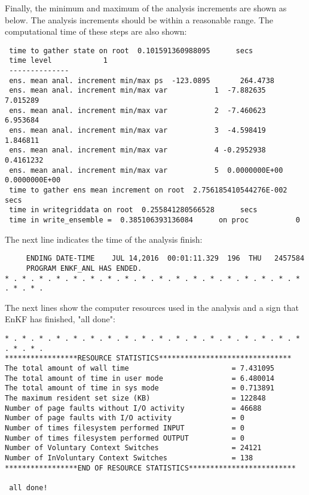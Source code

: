Finally, the minimum and maximum of the analysis increments are shown as below. The analysis increments should be within a reasonable range. The computational time of these steps are also shown:
\begin{scriptsize}
\begin{verbatim}
 time to gather state on root  0.101591360988095      secs
 time level            1
 --------------
 ens. mean anal. increment min/max ps  -123.0895       264.4738
 ens. mean anal. increment min/max var           1  -7.882635       7.015289
 ens. mean anal. increment min/max var           2  -7.460623       6.953684
 ens. mean anal. increment min/max var           3  -4.598419       1.846811
 ens. mean anal. increment min/max var           4 -0.2952938      0.4161232
 ens. mean anal. increment min/max var           5  0.0000000E+00  0.0000000E+00
 time to gather ens mean increment on root  2.756185410544276E-002 secs
 time in writegriddata on root  0.255841280566528      secs
 time in write_ensemble =  0.385106393136084      on proc           0
\end{verbatim}
\end{scriptsize}

The next line indicates the time of the analysis finish:
\begin{scriptsize}
\begin{verbatim}
     ENDING DATE-TIME    JUL 14,2016  00:01:11.329  196  THU   2457584
     PROGRAM ENKF_ANL HAS ENDED.
* . * . * . * . * . * . * . * . * . * . * . * . * . * . * . * . * . * . * . * .
\end{verbatim}
\end{scriptsize}

The next lines show the computer resources used in the analysis and a sign that EnKF has finished, "all done":
\begin{scriptsize}
\begin{verbatim}
* . * . * . * . * . * . * . * . * . * . * . * . * . * . * . * . * . * . * . * .
*****************RESOURCE STATISTICS*******************************
The total amount of wall time                        = 7.431095
The total amount of time in user mode                = 6.480014
The total amount of time in sys mode                 = 0.713891
The maximum resident set size (KB)                   = 122848
Number of page faults without I/O activity           = 46688
Number of page faults with I/O activity              = 0
Number of times filesystem performed INPUT           = 0
Number of times filesystem performed OUTPUT          = 0
Number of Voluntary Context Switches                 = 24121
Number of InVoluntary Context Switches               = 138
*****************END OF RESOURCE STATISTICS*************************

 all done!
\end{verbatim}
\end{scriptsize}

